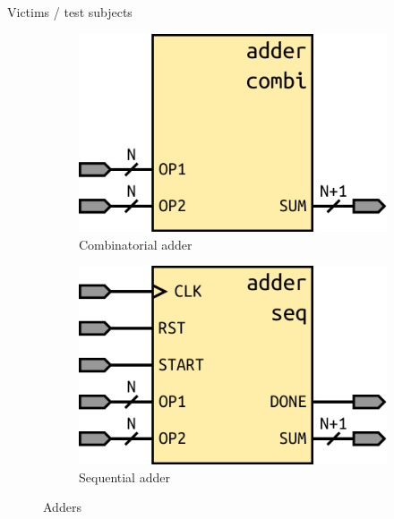\documentclass[a4paper, 12pt, onecolumn]{article}
\begin{document}
\begin{section}{Victims / test subjects}
    \begin{figure}[!h]
        \centering
        \begin{subfigure}[t]{0.35\textwidth}
            \centering
            \includegraphics[width=1.0\textwidth]{figs/adder_combinatorial_interface.pdf}
            \caption{Combinatorial adder}
            \label{fig:adder_combinatorial_interface}
        \end{subfigure}
        \hspace{1em}
        \begin{subfigure}[t]{0.35\textwidth}
            \centering
            \includegraphics[width=1.0\textwidth]{figs/adder_sequential_interface.pdf}
            \caption{Sequential adder}
            \label{fig:adder_sequential_interface}
        \end{subfigure}
        \caption{Adders}
    \end{figure}
\end{section}
\end{document}
